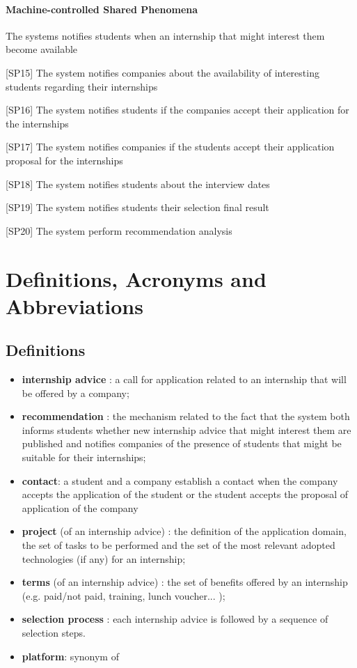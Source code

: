 				\paragraph{Machine-controlled Shared Phenomena}
					\begin{flushleft}
						[SP14] The systems notifies students when an internship that might interest them become available
						
						[SP15] The system notifies companies about the availability of interesting students regarding their internships
						
						[SP16] The system notifies students if the companies accept their application for the internships
						
						[SP17] The system notifies companies if the students accept their application proposal for the internships
						
						[SP18] The system notifies students about the interview dates
						
						[SP19] The system notifies students their selection final result
						
						[SP20] The system perform recommendation analysis
					\end{flushleft} 
					
	\section{Definitions, Acronyms and Abbreviations}
		\subsection{Definitions}
			\begin{itemize}
				\item \textbf{internship advice} : a call for application related to an internship that will be offered by a company;
				\item \textbf{recommendation} : the mechanism related to the fact that the system both informs students whether new internship advice that might interest them are published and notifies companies of the presence of students that might be suitable for their internships;
				\item \textbf{contact}: a student and a company establish a contact when the company accepts the application of the student or the student accepts the proposal of application of the company
				\item \textbf{project} (of an internship advice) : the definition of the application domain, the set of tasks to be performed and the set of the most relevant adopted technologies (if any) for an internship;
				\item \textbf{terms} (of an internship advice) : the set of benefits offered by an internship (e.g. paid/not paid, training, lunch voucher... );
				\item \textbf{selection process} : each internship advice is followed by a sequence of selection steps.
				\item \textbf{platform}: synonym of  
			\end{itemize}
